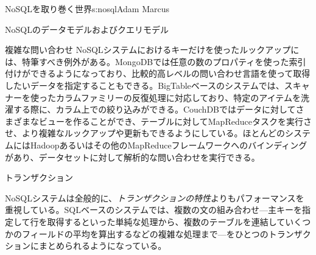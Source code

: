 \begin{aosachapter}{NoSQLを取り巻く世界}{s:nosql}{Adam Marcus}
\begin{aosasect1}{NoSQLのデータモデルおよびクエリモデル}
\begin{aosasect2}{複雑な問い合わせ}
NoSQLシステムにおけるキーだけを使ったルックアップには、特筆すべき例外がある。MongoDBでは任意の数のプロパティを使った索引付けができるようになっており、比較的高レベルの問い合わせ言語を使って取得したいデータを指定することもできる。BigTableベースのシステムでは、スキャナーを使ったカラムファミリーの反復処理に対応しており、特定のアイテムを洗濯する際に、カラム上での絞り込みができる。CouchDBではデータに対してさまざまなビューを作ることができ、テーブルに対してMapReduceタスクを実行させ、より複雑なルックアップや更新もできるようにしている。ほとんどのシステムにはHadoopあるいはその他のMapReduceフレームワークへのバインディングがあり、データセットに対して解析的な問い合わせを実行できる。

\end{aosasect2}

\begin{aosasect2}{トランザクション}

NoSQLシステムは全般的に、\emph{トランザクションの特性}よりもパフォーマンスを重視している。SQLベースのシステムでは、複数の文の組み合わせ---主キーを指定して行を取得するといった単純な処理から、複数のテーブルを連結していくつかのフィールドの平均を算出するなどの複雑な処理まで---をひとつのトランザクションにまとめられるようになっている。


\end{aosasect2}
\end{aosasect1}
\end{aosachapter}
